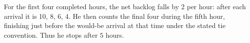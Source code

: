 For the first four completed hours, the net backlog falls by 2 per hour: after each arrival it is 10, 8, 6, 4. He then counts the final four during the fifth hour, finishing just before the would-be arrival at that time under the stated tie convention. Thus he stops after $\boxed5$ hours.
